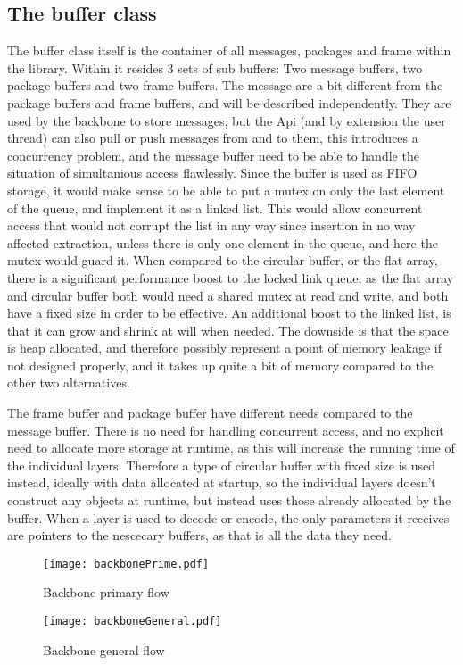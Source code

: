 \subsection{The buffer class}
The buffer class itself is the container of all messages, packages and frame within the library. Within it resides 3 sets of sub buffers: Two message buffers, two package buffers and two frame buffers. 
The message are a bit different from the package buffers and frame buffers, and will be described independently. They are used by the backbone to store messages, but the Api (and by extension the user thread) can also pull or push messages from and to them, this introduces a concurrency problem, and the message buffer need to be able to handle the situation of simultanious access flawlessly.
Since the buffer is used as FIFO storage, it would make sense to be able to put a mutex on only the last element of the queue, and implement it as a linked list.
This would allow concurrent access that would not corrupt the list in any way since insertion in no way affected extraction, unless there is only one element in the queue, and here the mutex would guard it.
When compared to the circular buffer, or the flat array, there is a significant performance boost to the locked link queue, as the flat array and circular buffer both would need a shared mutex at read and write, and both have a fixed size in order to be effective.
An additional boost to the linked list, is that it can grow and shrink at will when needed. The downside is that the space is heap allocated, and therefore possibly represent a point of memory leakage if not designed properly, and it takes up quite a bit of memory compared to the other two alternatives.

The frame buffer and package buffer have different needs compared to the message buffer. There is no need for handling concurrent access, and no explicit need to allocate more storage at runtime, as this will increase the running time of the individual layers.
Therefore a type of circular buffer with fixed size is used instead, ideally with data allocated at startup, so the individual layers doesn't construct any objects at runtime, but instead uses those already allocated by the buffer.
When a layer is used to decode or encode, the only parameters it receives are pointers to the nescecary buffers, as that is all the data they need.






\begin{figure}[htb]
	\begin{center}
	\texttt{[image: backbonePrime.pdf]}
	\caption{Backbone primary flow}
	\label{fig:backboneprime}	
	\end{center}
\end{figure}


\begin{figure}[htb]
	\begin{center}
	\texttt{[image: backboneGeneral.pdf]}
	\caption{Backbone general flow}
	\label{fig:backbonegeneralt}	
	\end{center}
\end{figure}
